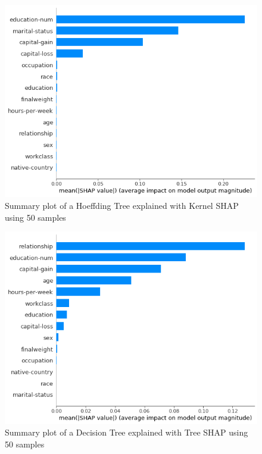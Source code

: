 \documentclass[conference]{IEEEtran}
\begin{document}
\begin{figure}[htbp]
\centerline{
	\includegraphics[width=\linewidth]{../fig/ex_01_KernelShap_HoeffdingTree_50_Samples_SummaryPlot.png}
}
\caption{Summary plot of a Hoeffding Tree explained with Kernel SHAP using 50 samples}
\label{fig1}
\end{figure}

\begin{figure}[htbp]
\centerline{
	\includegraphics[width=\linewidth]{../fig/ex_01_TreeShap_DecisionTree_50_Samples_SummaryPlot.png}
}
\caption{Summary plot of a Decision Tree explained with Tree SHAP using 50 samples}
\label{fig2}
\end{figure}
\end{document}
